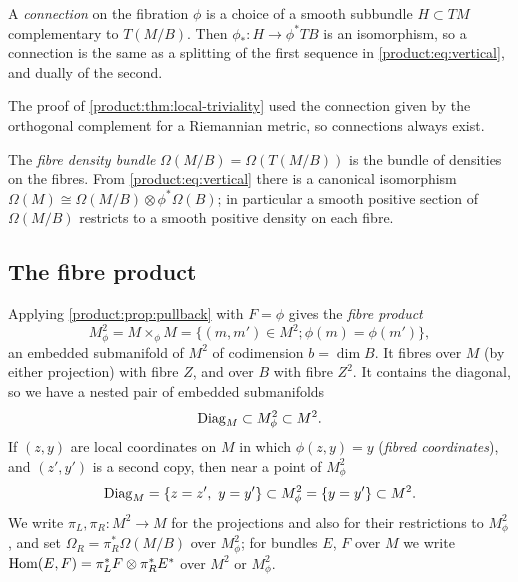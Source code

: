 \begin{definition}\label{product:def:connection}
A \emph{connection} on the fibration $\phi$ is a choice of a smooth subbundle
$H\subset TM$ complementary to $T(M/B)$. Then $\phi_*:H\longrightarrow\phi^*TB$ is
an isomorphism, so a connection is the same as a splitting of the first sequence
in \eqref{product:eq:vertical}, and dually of the second.
\end{definition}

The proof of \cref{product:thm:local-triviality} used the connection given by
the orthogonal complement for a Riemannian metric, so connections always exist.

The \emph{fibre density bundle} $\Omega(M/B)=\Omega(T(M/B))$ is the bundle of
densities on the fibres. From \eqref{product:eq:vertical} there is a canonical
isomorphism $\Omega(M)\cong\Omega(M/B)\otimes\phi^*\Omega(B)$; in particular
a smooth positive section of $\Omega(M/B)$ restricts to a smooth positive density
on each fibre.

\subsection{The fibre product}
Applying \cref{product:prop:pullback} with $F=\phi$ gives the \emph{fibre
product}
\begin{equation*}
M^2_\phi=M\times_\phi M=\{(m,m')\in M^2;\phi(m)=\phi(m')\},
\end{equation*}
an embedded submanifold of $M^2$ of codimension $b=\dim B$. It fibres over $M$
(by either projection) with fibre $Z$, and over $B$ with fibre $Z^2$. It contains
the diagonal, so we have a nested pair of embedded submanifolds
\begin{equation}\label{product:eq:nested}
\operatorname{Diag}_M\subset M^2_\phi\subset M^2.
\end{equation}
If $(z,y)$ are local coordinates on $M$ in which $\phi(z,y)=y$ (\emph{fibred
coordinates}), and $(z',y')$ is a second copy, then near a point of $M^2_\phi$
\begin{equation}\label{product:eq:nested-coords}
\operatorname{Diag}_M=\{z=z',\ y=y'\}\subset M^2_\phi=\{y=y'\}\subset M^2.
\end{equation}
We write $\pi_L,\pi_R:M^2\longrightarrow M$ for the projections and also for
their restrictions to $M^2_\phi$, and set
$\Omega_R=\pi_R^*\Omega(M/B)$ over $M^2_\phi$; for bundles $E$, $F$ over $M$ we
write $\operatorname{Hom}(E,F)=\pi_L^*F\otimes\pi_R^*E^*$ over $M^2$ or $M^2_\phi$.

